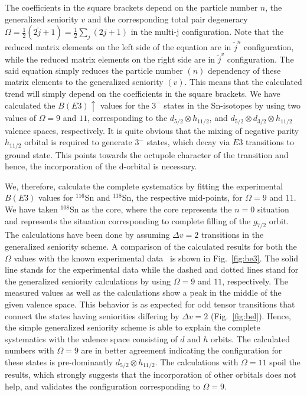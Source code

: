 \documentclass[twocolumn,showpacs,showkeys,preprintnumbers,amsmath,amssymb]{revtex4}
\begin{document}
The coefficients in the square brackets depend on the particle number $n$, the generalized seniority $v$ and the corresponding total pair degeneracy $\Omega= \frac{1}{2}(2 \tilde{j} +1)= \frac{1}{2} \sum \limits_j (2j+1)$ in the multi-j configuration. Note that the reduced matrix elements on the left side of the equation are in $\tilde{j}^n$ configuration, while the reduced matrix elements on the right side are in $\tilde{j}^v$ configuration. The said equation simply reduces the particle number $(n)$ dependency of these matrix elements to the generalized seniority $(v)$. This means that the calculated trend will simply depend on the coefficients in the square brackets. We have calculated the $B(E3) \uparrow$ values for the $3^-$ states in the Sn-isotopes by using two values of $\Omega= 9$ and $11$, corresponding to the $d_{5/2} \otimes h_{11/2}$, and $d_{5/2} \otimes d_{3/2} \otimes h_{11/2}$ valence spaces, respectively. It is quite obvious that the mixing of negative parity $h_{11/2}$ orbital is required to generate $3^-$ states, which decay via $E3$ transitions to ground state. This points towards the octupole character of the transition and hence, the incorporation of the d-orbital is necessary. 

We, therefore, calculate the complete systematics by fitting the experimental $B(E3)$ values for $^{116}$Sn and $^{118}$Sn, the respective mid-points, for $\Omega=9$ and $11$. We have taken $^{108}$Sn as the core, where the core represents the $n=0$ situation and represents the situation corresponding to complete filling of the $g_{7/2}$ orbit. The calculations have been done by assuming $\Delta v =2$ transitions in the generalized seniority scheme. A comparison of the calculated results for both the $\Omega$ values with the known experimental data~\cite{kibedi} is shown in Fig.~\ref{fig:be3}. The solid line stands for the experimental data while the dashed and dotted lines stand for the generalized seniority calculations by using $\Omega=9$ and $11$, respectively. The measured values as well as the calculations show a peak in the middle of the given valence space. This behavior is as expected for odd tensor transitions that connect the states having seniorities differing by $\Delta v=2$ (Fig.~\ref{fig:bel}). Hence, the simple generalized seniority scheme is able to explain the complete systematics with the valence space consisting of $d$ and $h$ orbits. The calculated numbers with $\Omega=9$ are in better agreement indicating the configuration for these states is pre-dominantly $d_{5/2} \otimes h_{11/2}$. The calculations with $\Omega = 11$ spoil the results, which strongly suggests that the incorporation of other orbitals does not help, and validates the configuration corresponding to $\Omega = 9$.
\end{document}
